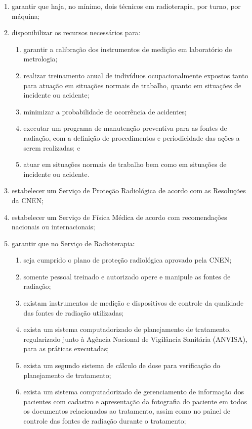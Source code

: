 \begin{enumerate}[label=\Roman*.]
    \item garantir que haja, no mínimo, dois técnicos em radioterapia, por turno, por máquina;
    \item disponibilizar os recursos necessários para:
    \begin{enumerate}
        \item garantir a calibração dos instrumentos de medição em laboratório 	de metrologia;
        \item realizar treinamento anual de indivíduos ocupacionalmente 	expostos tanto para atuação em situações normais de trabalho, quanto em 	situações de incidente ou acidente;
        \item  minimizar a probabilidade de ocorrência de acidentes;
        \item executar um programa de manutenção preventiva para as fontes 	de radiação, com a definição de procedimentos e periodicidade das ações a serem realizadas; e
        \item atuar em situações normais de trabalho bem como em situações 	de incidente ou acidente.
    \end{enumerate}
    \item estabelecer um Serviço de Proteção Radiológica de acordo com as Resoluções da CNEN;
    \item estabelecer um Serviço de Física Médica de acordo com recomendações nacionais ou internacionais;
    \item garantir que no Serviço de Radioterapia:
    \begin{enumerate}
        \item seja cumprido o plano de proteção radiológica aprovado pela 	CNEN;
        \item somente pessoal treinado e autorizado opere e manipule as fontes 	de radiação;
        \item existam instrumentos de medição e dispositivos de controle da 	qualidade das fontes de radiação utilizadas;
        \item exista um sistema computadorizado de planejamento de 	tratamento, regularizado junto à Agência Nacional de Vigilância Sanitária 	(ANVISA), para as práticas executadas;
        \item  exista um segundo sistema de cálculo de dose para verificação 	do planejamento de tratamento;
        \item  exista um sistema computadorizado de gerenciamento de 	informação dos pacientes com cadastro e apresentação da fotografia do 	paciente em todos os documentos relacionados ao tratamento, assim como no 	painel de controle das fontes de radiação durante o tratamento;

\end{enumerate}
\end{enumerate}
